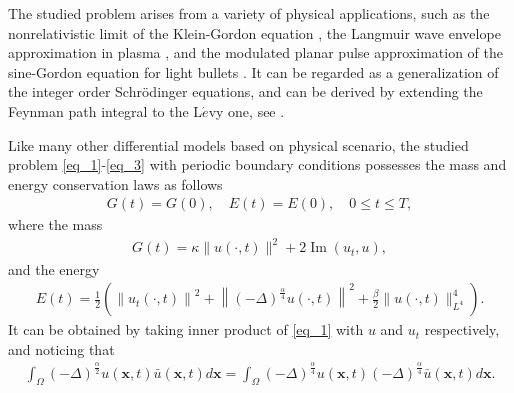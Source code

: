 \documentclass[preprint,compress,3p,10pt,fleqn]{elsarticle}
\numberwithin{equation}{section}
\begin{document}

The studied problem arises from a variety of physical applications, such as the nonrelativistic limit of the Klein-Gordon equation \cite{tsutsumiNonrelativisticApproximationNonlinear1984,machiharaNonrelativisticLimitEnergy2002}, the Langmuir wave envelope approximation in plasma \cite{colinSemidiscretizationTimeNonlinear1998}, and the modulated planar pulse approximation of the sine-Gordon equation for light bullets \cite{baoComparisonsSineGordonPerturbed2010,xinModelingLightBullets2000}. It can be regarded as a generalization of the integer order Schr{\"o}dinger equations, and can be derived by extending the Feynman path integral to the L$\acute{e}$vy one, see \cite{laskinFractionalQuantumMechanics2000,laskinFractionalSchrodingerEquation2002}.

Like many other differential models based on physical scenario, the studied problem \eqref{eq_1}-\eqref{eq_3} with periodic boundary conditions possesses the mass and energy conservation laws as follows
\begin{align}\label{eq_7}
G(t)=G(0), \quad E(t)=E(0), \quad 0 \leq t \leq T,
\end{align}
where the mass
\begin{align}\label{eq_8}
G(t)=\kappa\|u(\cdot, t)\|^{2}+2\operatorname{Im}\left(u_{t}, u\right),
\end{align}
and the energy
\begin{align}\label{eq_9}
E(t)=\frac{1}{2}\left(\left\|u_{t}(\cdot, t)\right\|^{2}+\left\|(-\Delta)^{\frac{\alpha}{4}} u(\cdot, t)\right\|^{2}+\frac{\beta}{2}\|u(\cdot, t)\|_{L^{4}}^{4}\right).
\end{align}
It can be obtained by taking inner product of \eqref{eq_1} with $u$ and $u_{t}$ respectively, and noticing that
 \begin{align} \label{eq_11223}
 	\int_{\Omega}(-\Delta)^{\frac{\alpha}{2}} u(\boldsymbol{x}, t) \bar{u}(\boldsymbol{x}, t) d \boldsymbol{x}=\int_{\Omega}(-\Delta)^{\frac{\alpha}{4}} u(\boldsymbol{x}, t)(-\Delta)^{\frac{\alpha}{4}} \bar{u}(\boldsymbol{x}, t) d \boldsymbol{x}.
 \end{align}
\end{document}
